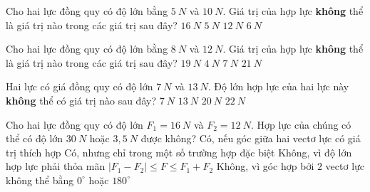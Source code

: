 \begin{ex}%
Cho hai lực đồng quy có độ lớn bằng $5\ N$ và $10\ N$. Giá trị của hợp lực \textbf{không} thể là giá trị nào trong các giá trị sau đây?
\choice
{\True $16\ N$}
{$5\ N$}
{$12\ N$}
{$6\ N$}
 \end{ex}
\begin{ex}%
Cho hai lực đồng quy có độ lớn bằng $8\ N$ và $12\ N$. Giá trị của hợp lực \textbf{không} thể là giá trị nào trong các giá trị sau đây?
\choice
{$19\ N$}
{$4\ N$}
{$7\ N$}
{\True $21\ N$}

 \end{ex}
\begin{ex}%
Hai lực có giá đồng quy có độ lớn $7\ N$ và $13\ N$. Độ lớn hợp lực của hai lực này \textbf{không} thể có giá trị nào sau đây?
\choice
{$7\ N$}
{$13\ N$}
{$20\ N$}
{\True $22\ N$}

 \end{ex}

\begin{ex}%
Cho hai lực đồng quy có độ lớn $F_1=16\ N$ và $F_2=12\ N$. Hợp lực của chúng có thể có độ lớn $30\ N$ hoặc $3,5\ N$ được không?
\choice
{Có, nếu góc giữa hai vectơ lực có giá trị thích hợp}
{Có, nhưng chỉ trong một số trường hợp đặc biệt}
{\True Không, vì độ lớn hợp lực phải thỏa mãn $|F_1-F_2|\le F\le F_1+F_2$}
{Không, vì góc hợp bởi $2$ vectơ lực không thể bằng $0^\circ$ hoặc $180^\circ$}
 \end{ex}

